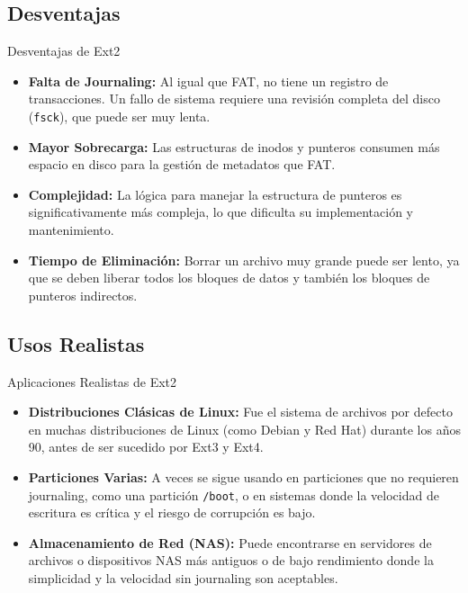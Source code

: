 \documentclass{beamer}
\begin{document}
\subsection{Desventajas}
\begin{frame}{Desventajas de Ext2}
    \begin{itemize}
        \item \textbf{Falta de Journaling:} Al igual que FAT, no tiene un registro de transacciones. Un fallo de sistema requiere una revisión completa del disco (\texttt{fsck}), que puede ser muy lenta.
        \vspace{0.5cm}
        \item \textbf{Mayor Sobrecarga:} Las estructuras de inodos y punteros consumen más espacio en disco para la gestión de metadatos que FAT.
        \vspace{0.5cm}
        \item \textbf{Complejidad:} La lógica para manejar la estructura de punteros es significativamente más compleja, lo que dificulta su implementación y mantenimiento.
        \vspace{0.5cm}
        \item \textbf{Tiempo de Eliminación:} Borrar un archivo muy grande puede ser lento, ya que se deben liberar todos los bloques de datos y también los bloques de punteros indirectos.
    \end{itemize}
\end{frame}

\subsection{Usos Realistas}
\begin{frame}{Aplicaciones Realistas de Ext2}
    \begin{itemize}
        \item \textbf{Distribuciones Clásicas de Linux:} Fue el sistema de archivos por defecto en muchas distribuciones de Linux (como Debian y Red Hat) durante los años 90, antes de ser sucedido por Ext3 y Ext4.
        \vspace{0.5cm}
        \item \textbf{Particiones Varias:} A veces se sigue usando en particiones que no requieren journaling, como una partición \texttt{/boot}, o en sistemas donde la velocidad de escritura es crítica y el riesgo de corrupción es bajo.
        \vspace{0.5cm}
        \item \textbf{Almacenamiento de Red (NAS):} Puede encontrarse en servidores de archivos o dispositivos NAS más antiguos o de bajo rendimiento donde la simplicidad y la velocidad sin journaling son aceptables.
    \end{itemize}
\end{frame}
\end{document}
